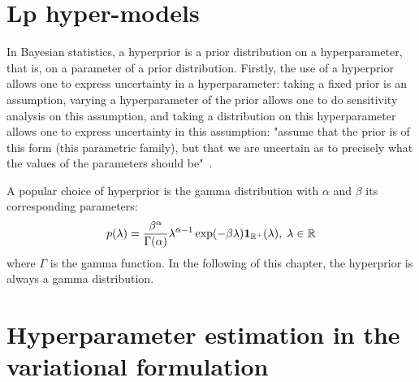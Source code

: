\section{Lp hyper-models}
In Bayesian statistics, a hyperprior is a prior distribution on a hyperparameter, that is, on a parameter of a prior distribution.
Firstly, the use of a hyperprior allows one to express uncertainty in a hyperparameter: taking a fixed prior is an assumption, varying a hyperparameter of the prior allows one to do sensitivity analysis on this assumption, and taking a distribution on this hyperparameter allows one to express uncertainty in this assumption: "assume that the prior is of this form (this parametric family), but that we are uncertain as to precisely what the values of the parameters should be"~\cite{bernardo2001bayesian}.

A popular choice of hyperprior is the gamma distribution with $\alpha$ and $\beta$ its corresponding parameters:
\begin{equation} \label{eq:gamma_dist}
	p(\lambda) = \frac{\beta^\alpha}{\Gamma(\alpha)}\lambda^{\alpha-1}\exp(-\beta\lambda)\mathbf{1}_{\mathbb{R}^+}(\lambda), \; \lambda \in \mathbb{R}
\end{equation}
where $\Gamma$ is the gamma function. In the following of this chapter, the hyperprior is always a gamma distribution.


\section{Hyperparameter estimation in the variational formulation}

